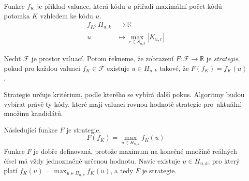 
\begin{prikl}\label{prjednokrokfce}
    Funkce $f_K$ je příklad valuace, která kódu $u$ přiřadí maximální počet kódů potomka $K$ vzhledem ke kódu $u$.
    \begin{align*}
        f_K \colon H_{n,k} &\to \mathbb{R} \\
        u &\mapsto \max_{r\in S_{n,k}} |K_{u,r}|
    \end{align*}
\end{prikl}


\begin{definice}[Strategie]
    Nechť $\mathcal{F}$ je prostor valuací. Potom řekneme, že zobrazení $F \colon \mathcal{F} \to \mathbb{R}$ je \emph{strategie}, pokud pro každou valuaci $f_K \in \mathcal{F}$ existuje $u\in H_{n,k}$ takové, že $F(f_K) = f_K(u)$.
\end{definice}
Strategie určuje kritérium, podle kterého se vybírá další pokus. Algoritmy budou vybírat právě ty kódy, které mají valuaci rovnou hodnotě strategie pro~aktuální množinu kandidátů. 


\begin{prikl}\label{prstrategie}
    Následující funkce $F$ je strategie.
    \[F(f_K) =  \max_{u\in H_{n,k}} f_K(u)\]
    Funkce $F$ je dobře definovaná, protože maximum na konečné množině reálných čísel má vždy jednoznačně určenou hodnotu. Navíc existuje $u\in H_{n,k}$, pro který platí $f_K(u) = \max_{u\in H_{n,k}} f_K(u)$, a tedy $F$ je strategie.
\end{prikl}



